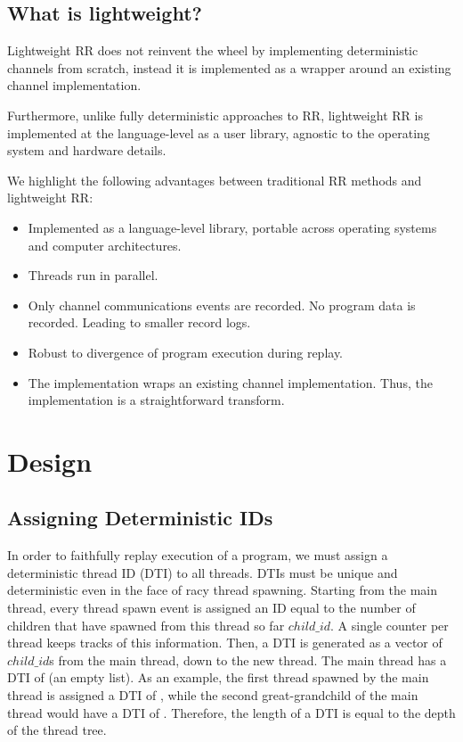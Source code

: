 \subsection{What is lightweight?}
Lightweight RR does not reinvent the wheel by implementing deterministic channels from
scratch, instead it is implemented as a wrapper around an existing channel
implementation.

Furthermore, unlike fully deterministic approaches to RR, lightweight RR is
implemented at the language-level as a user library, agnostic to the operating system and
hardware details.

We highlight the following advantages between traditional RR methods and lightweight RR:
\begin{itemize}
\item Implemented as a language-level library, portable across operating systems and
  computer architectures.
\item Threads run in parallel.
\item Only channel communications events are recorded. No program data is recorded.
  Leading to smaller record logs.
\item Robust to divergence of program execution during replay.
\item The implementation wraps an existing channel implementation. Thus, the implementation is a straightforward transform.
\end{itemize}

\section{Design}
\subsection{Assigning Deterministic IDs}
In order to faithfully replay execution of a program, we must assign a deterministic
thread ID (DTI) to all threads. DTIs must be unique and deterministic
even in the face of racy thread spawning. Starting from the main thread,
every thread spawn event is assigned an ID equal to the number of children that
have spawned from this thread so far $child\_id$. A single counter per thread keeps tracks of this information. Then, a DTI is generated as a vector of $child\_id$s from the main thread, down to the new thread. The main thread has a DTI of \code{[]} (an empty list). As an example, the first thread spawned by the main thread is assigned a DTI of \code{[1]}, while the second great-grandchild of the main thread would have a DTI of \code{[1, 1, 2]}. Therefore, the length of a DTI is equal to the depth of the thread tree.

